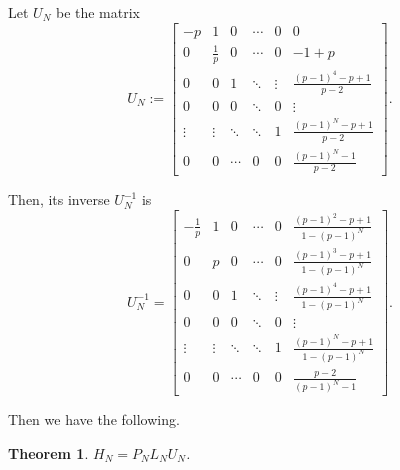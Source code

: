 \documentclass[12pt, leqno]{amsart}
\numberwithin{equation}{section}
\theoremstyle{plain}
\newtheorem{thm}{Theorem}[section]
\theoremstyle{definition}
\newcommand{\0}{\mathbf{0}}
\begin{document}
Let $U_N$ be the matrix
\[
U_N:=\begin{bmatrix}
-p&1&0&\cdots&0&0\\
0&\frac{1}{p}&0&\cdots&0&-1+p\\
0&0&1&\ddots&\vdots&\frac{(p-1)^{4}-p+1}{p-2}\\
0&0&0&\ddots&0&\vdots\\
\vdots&\vdots&\ddots&\ddots&1&\frac{(p-1)^{N}-p+1}{p-2}\\
0&0&\cdots&0&0&\frac{(p-1)^{N}-1}{p-2}
\end{bmatrix}.
\]

Then, its inverse $U_N^{-1}$ is 
\[
U_N^{-1}=\begin{bmatrix}
-\frac{1}{p}&1&0&\cdots&0&\frac{(p-1)^2-p+1}{1-(p-1)^N}\\
0&p&0&\cdots&0&\frac{(p-1)^3-p+1}{1-(p-1)^N}\\
0&0&1&\ddots&\vdots&\frac{(p-1)^4-p+1}{1-(p-1)^N}\\
0&0&0&\ddots&0&\vdots\\
\vdots&\vdots&\ddots&\ddots&1&\frac{(p-1)^{N}-p+1}{1-(p-1)^N}\\
0&0&\cdots&0&0&\frac{p-2}{(p-1)^N-1}
\end{bmatrix}.
\]


Then we have the following.
\begin{thm}\label{decomposition2}
$H_N=P_NL_NU_N$.
\end{thm}
\end{document}
